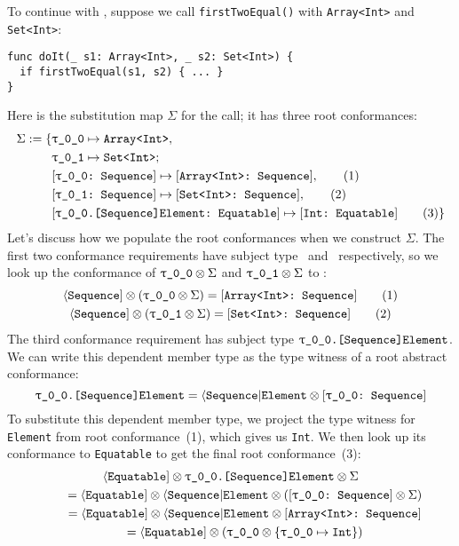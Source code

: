 \documentclass[../generics]{subfiles}
\begin{document}
\begin{example}\label{abstract conformance example 2}
To continue with , suppose we call \texttt{firstTwoEqual()} with \texttt{Array<Int>} and \texttt{Set<Int>}:
\begin{Verbatim}
func doIt(_ s1: Array<Int>, _ s2: Set<Int>) {
  if firstTwoEqual(s1, s2) { ... }
}
\end{Verbatim}
Here is the substitution map $\Sigma$ for the call; it has three root conformances:
\begin{align*}
\Sigma := \{
&\SubstType{\rT}{Array<Int>},\\
&\SubstType{\rU}{Set<Int>};\\
&\SubstConf{\rT}{Array<Int>}{Sequence},\tag{1}\\
&\SubstConf{\rU}{Set<Int>}{Sequence},\tag{2}\\
&\SubstConf{\rT.[Sequence]Element}{Int}{Equatable}\tag{3}
\}
\end{align*}
Let's discuss how we populate the root conformances when we construct $\Sigma$. The first two conformance requirements have subject type \rT\ and \rU\ respectively, so we look up the conformance of $\rT\otimes\Sigma$ and $\rU\otimes\Sigma$ to \tSequence:
\begin{gather*}
\PSequence \otimes (\rT \otimes \Sigma) = \ConfReq{Array<Int>}{Sequence}\tag{1}\\
\PSequence \otimes (\rU \otimes \Sigma) = \ConfReq{Set<Int>}{Sequence}\tag{2}
\end{gather*}
The third conformance requirement has subject type $\texttt{\rT.[Sequence]Element}$. We can write this dependent member type as the type witness of a root abstract conformance:
\[\texttt{\rT.[Sequence]Element} = \AElement \otimes \ConfReq{\rT}{Sequence}\]
To substitute this dependent member type, we project the type witness for \texttt{Element} from root conformance~(1), which gives us \texttt{Int}. We then look up its conformance to \texttt{Equatable} to get the final root conformance~(3):
\begin{gather*}
\Proto{Equatable} \otimes \texttt{\rT.[Sequence]Element} \otimes \Sigma\\
\qquad {} = \Proto{Equatable} \otimes \AElement \otimes (\ConfReq{\rT}{Sequence} \otimes \Sigma)\\
\qquad {} = \Proto{Equatable} \otimes \AElement \otimes \ConfReq{Array<Int>}{Sequence}\\
\qquad {} = \Proto{Equatable} \otimes (\rT \otimes \SubMapInt)\\

\end{gather*}
\end{example}
\end{document}
